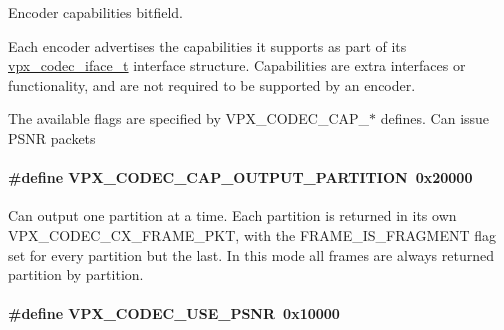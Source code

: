 \-Encoder capabilities bitfield. 

\-Each encoder advertises the capabilities it supports as part of its \hyperlink{group__codec_gad654f3da60151f5dfef70aca00ef1e9e}{vpx\-\_\-codec\-\_\-iface\-\_\-t} interface structure. \-Capabilities are extra interfaces or functionality, and are not required to be supported by an encoder.

\-The available flags are specified by \-V\-P\-X\-\_\-\-C\-O\-D\-E\-C\-\_\-\-C\-A\-P\-\_\-$\ast$ defines. \-Can issue \-P\-S\-N\-R packets \hypertarget{group__encoder_ga69768adb51faa28d98870cbc77e9ea93}{
\paragraph[{\-V\-P\-X\-\_\-\-C\-O\-D\-E\-C\-\_\-\-C\-A\-P\-\_\-\-O\-U\-T\-P\-U\-T\-\_\-\-P\-A\-R\-T\-I\-T\-I\-O\-N}]{\setlength{\rightskip}{0pt plus 5cm}\#define \-V\-P\-X\-\_\-\-C\-O\-D\-E\-C\-\_\-\-C\-A\-P\-\_\-\-O\-U\-T\-P\-U\-T\-\_\-\-P\-A\-R\-T\-I\-T\-I\-O\-N~0x20000}}
\label{group__encoder_ga69768adb51faa28d98870cbc77e9ea93}
\-Can output one partition at a time. \-Each partition is returned in its own \-V\-P\-X\-\_\-\-C\-O\-D\-E\-C\-\_\-\-C\-X\-\_\-\-F\-R\-A\-M\-E\-\_\-\-P\-K\-T, with the \-F\-R\-A\-M\-E\-\_\-\-I\-S\-\_\-\-F\-R\-A\-G\-M\-E\-N\-T flag set for every partition but the last. \-In this mode all frames are always returned partition by partition. \hypertarget{group__encoder_ga57bb9eb1881c7e4bf86580660a5e40a0}{
\paragraph[{\-V\-P\-X\-\_\-\-C\-O\-D\-E\-C\-\_\-\-U\-S\-E\-\_\-\-P\-S\-N\-R}]{\setlength{\rightskip}{0pt plus 5cm}\#define \-V\-P\-X\-\_\-\-C\-O\-D\-E\-C\-\_\-\-U\-S\-E\-\_\-\-P\-S\-N\-R~0x10000}}
\label{group__encoder_ga57bb9eb1881c7e4bf86580660a5e40a0}



